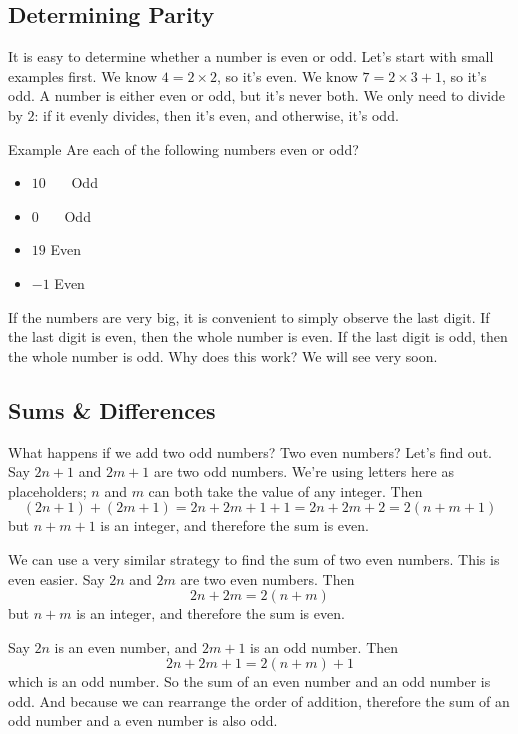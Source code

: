 \documentclass[a4paper,10pt]{report}
\begin{document}
\subsection{Determining Parity}
It is easy to determine whether a number is even or odd. Let's start with small
examples first. We know $4=2\times2$, so it's even. We know $7=2\times3+1$, so
it's odd. A number is either even or odd, but it's never both. We only need to
divide by $2$: if it evenly divides, then it's even, and otherwise, it's odd.

\begin{problem}{Example}
 Are each of the following numbers even or odd?

 \begin{itemize}
  \item $10$ \hfill {}~~~Odd
  \item $0$ \hfill {}~~~Odd
  \item $19$ \hfill Even~~~
  \item $-1$ \hfill Even~~~
 \end{itemize}
\end{problem}

If the numbers are very big, it is convenient to simply observe the last digit.
If the last digit is even, then the whole number is even. If the last digit is
odd, then the whole number is odd. Why does this work? We will see very soon.

\subsection{Sums \& Differences}

What happens if we add two odd numbers? Two even numbers? Let's find out. Say
$2n+1$ and $2m+1$ are two odd numbers. We're using letters here as placeholders;
$n$ and $m$ can both take the value of any integer. Then \[
 (2n+1) + (2m+1) = 2n + 2m + 1 + 1 = 2n + 2m + 2 = 2(n+m+1)
\] but $n+m+1$ is an integer, and therefore the sum is even.

We can use a very similar strategy to find the sum of two even numbers. This is
even easier. Say $2n$ and $2m$ are two even numbers. Then \[
 2n + 2m = 2(n+m)
\] but $n+m$ is an integer, and therefore the sum is even.

Say $2n$ is an even number, and $2m+1$ is an odd number. Then \[
 2n + 2m + 1 = 2(n+m) + 1
\] which is an odd number. So the sum of an even number and an odd number is
odd. And because we can rearrange the order of addition, therefore the sum of an
odd number and a even number is also odd.
\end{document}
